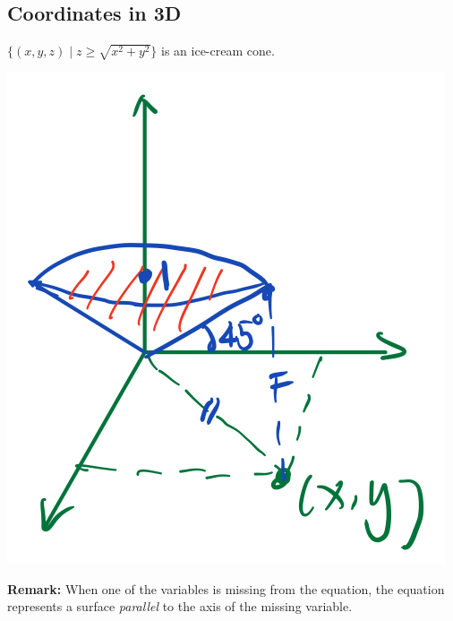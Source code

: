 
\begin{spacing}{1.3}
    \section{Coordinates in 3D}

    \eg $\{ (x,y,z)\mid z\ge \sqrt{x^2+y^2}\}$ is an ice-cream cone.

    \begin{center}
        \includegraphics[scale=0.25]{images/Ch10-cone.jpeg}
    \end{center}
    {\bf Remark: }When one of the variables is missing from the equation, 
    the equation represents a surface {\it parallel} to the axis of the 
    missing variable.


\end{spacing}

